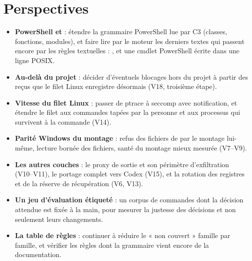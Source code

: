 \section*{Perspectives}
\begin{itemize}
  \item \textbf{PowerShell et } : étendre la grammaire PowerShell lue par C3
    (classes, fonctions, modules), et faire lire par le moteur les derniers textes qui passent
    encore par les règles textuelles : , et une cmdlet PowerShell écrite dans une
    ligne POSIX.
  \item \textbf{Au-delà du projet} : décider d'éventuels blocages hors du projet à partir des
    reçus que le filet Linux enregistre désormais (V18, troisième étape).
  \item \textbf{Vitesse du filet Linux} : passer de ptrace à seccomp avec notification, et étendre
    le filet aux commandes tapées par la personne et aux processus qui survivent à la commande
    (V14).
  \item \textbf{Parité Windows du montage} : refus des fichiers de \demo{} par le montage
    lui-même, lecture bornée des fichiers, santé du montage mieux mesurée (V7--V9).
  \item \textbf{Les autres couches} : le proxy de sortie et son périmètre d'exfiltration
    (V10--V11), le portage complet vers Codex (V15), et la rotation des registres et de la
    réserve de récupération (V6, V13).
  \item \textbf{Un jeu d'évaluation étiqueté} : un corpus de commandes dont la décision attendue
    est fixée à la main, pour mesurer la justesse des décisions et non seulement leurs
    changements.
  \item \textbf{La table de règles} : continuer à réduire le « non couvert » famille par famille, et
    vérifier les \nbnonverifiees{} règles dont la grammaire vient encore de la documentation.
\end{itemize}
